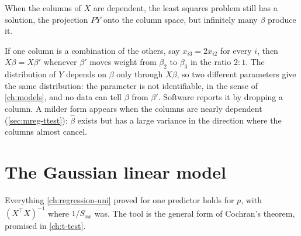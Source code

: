 When the columns of $X$ are dependent, the least squares problem still has a solution, the projection $PY$ onto the column space, but infinitely many $\beta$ produce it.

\begin{pitfall}
If one column is a combination of the others, say $x_{i3} = 2x_{i2}$ for every $i$, then $X\beta = X\beta'$ whenever $\beta'$ moves weight from $\beta_2$ to $\beta_3$ in the ratio $2 : 1$. The distribution of $Y$ depends on $\beta$ only through $X\beta$, so two different parameters give the same distribution: the parameter is not identifiable, in the sense of \cref{ch:models}, and no data can tell $\beta$ from $\beta'$. Software reports it by dropping a column. A milder form appears when the columns are nearly dependent (\cref{sec:mreg-ttest}): $\hat{\beta}$ exists but has a large variance in the direction where the columns almost cancel.
\end{pitfall}

\section{The Gaussian linear model}
\label{sec:mreg-gaussian}

Everything \cref{ch:regression-uni} proved for one predictor holds for $p$, with $(X^\top X)^{-1}$ where $1/S_{xx}$ was.
The tool is the general form of Cochran's theorem, promised in \cref{ch:t-test}.

